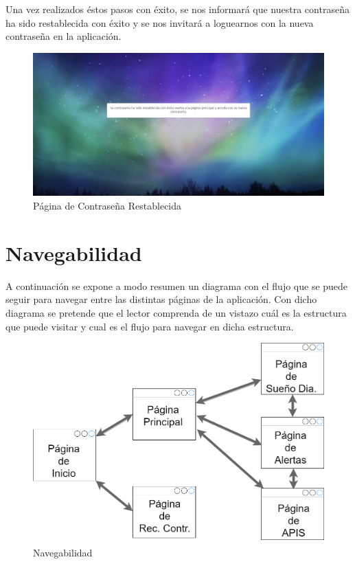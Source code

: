 \documentclass[11pt,openany]{book}
\begin{document}
\pagebreak
Una vez realizados éstos pasos con éxito, se nos informará que nuestra contraseña ha sido restablecida con éxito y se nos invitará a loguearnos con la nueva contraseña en la aplicación.

\begin{figure}[H]
\centering
\includegraphics[totalheight=6cm]{manualUsuario/contrase_aRestablecida.png}
\caption{Página de Contraseña Restablecida}
\end{figure}

\pagebreak
\section{Navegabilidad}

A continuación se expone a modo resumen un diagrama con el flujo que se puede seguir para navegar entre las distintas páginas de la aplicación. Con dicho diagrama se pretende que el lector comprenda de un vistazo cuál es la estructura que puede visitar y cual es el flujo para navegar en dicha estructura.

\begin{figure}[H]
\centering
\includegraphics[totalheight=9cm]{manualUsuario/Navegabilidad.png}
\caption{Navegabilidad}
\end{figure}
\end{document}

